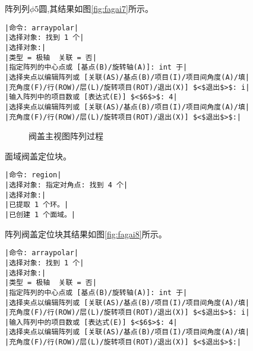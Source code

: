 \begin{procedure}
阵列列$\phi 5$圆,其结果如图\ref{fig:fagai7}所示。
\begin{lstlisting}
|命令: arraypolar|
|选择对象: 找到 1 个|
|选择对象:|
|类型 = 极轴  关联 = 否|
|指定阵列的中心点或 [基点(B)/旋转轴(A)]: int 于|
|选择夹点以编辑阵列或 [关联(AS)/基点(B)/项目(I)/项目间角度(A)/填|
|充角度(F)/行(ROW)/层(L)/旋转项目(ROT)/退出(X)] $<$退出$>$: i|
|输入阵列中的项目数或 [表达式(E)] $<$6$>$: 4|
|选择夹点以编辑阵列或 [关联(AS)/基点(B)/项目(I)/项目间角度(A)/填|
|充角度(F)/行(ROW)/层(L)/旋转项目(ROT)/退出(X)] $<$退出$>$:|
\end{lstlisting}
\begin{figure}[htbp]
\centering
{}\hspace{30pt}
\hspace{30pt}
\caption{阀盖主视图阵列过程}
\end{figure}
面域阀盖定位块。
\begin{lstlisting}
|命令: region|
|选择对象: 指定对角点: 找到 4 个|
|选择对象:|
|已提取 1 个环。|
|已创建 1 个面域。|
\end{lstlisting}
阵列阀盖定位块其结果如图\ref{fig:fagai8}所示。
\begin{lstlisting}
|命令: arraypolar|
|选择对象: 找到 1 个|
|选择对象:|
|类型 = 极轴  关联 = 否|
|指定阵列的中心点或 [基点(B)/旋转轴(A)]: int 于|
|选择夹点以编辑阵列或 [关联(AS)/基点(B)/项目(I)/项目间角度(A)/填|
|充角度(F)/行(ROW)/层(L)/旋转项目(ROT)/退出(X)] $<$退出$>$: i|
|输入阵列中的项目数或 [表达式(E)] $<$6$>$: 4|
|选择夹点以编辑阵列或 [关联(AS)/基点(B)/项目(I)/项目间角度(A)/填|
|充角度(F)/行(ROW)/层(L)/旋转项目(ROT)/退出(X)] $<$退出$>$:|
\end{lstlisting}
\end{procedure}
\endinput
